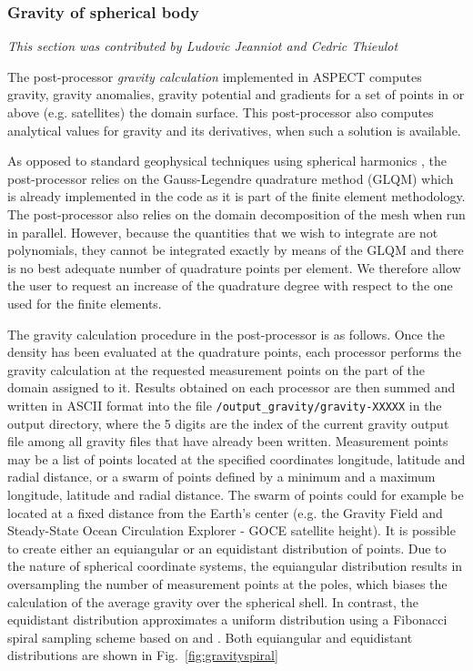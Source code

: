 \subsubsection{Gravity of spherical body}
\label{sec:benchmark_gravity_prem}

\textit{This section was contributed by Ludovic Jeanniot and Cedric Thieulot}

The post-processor \textit{gravity calculation} implemented in ASPECT computes gravity, gravity anomalies, gravity potential and gradients for a set of points in or above (e.g. satellites) the domain surface. This post-processor also computes  analytical values for gravity and its derivatives, when such a solution is available.

As opposed to standard geophysical techniques using spherical harmonics
\cite{sjoberg2017gravity}, the post-processor relies on the Gauss-Legendre quadrature method (GLQM) which is already implemented in the code 
as it is part of the finite element methodology. The post-processor also relies on the domain decomposition of the mesh when run in parallel. 
However, because the quantities that we wish to integrate are not polynomials, they cannot be integrated exactly by means of the GLQM and there is no best adequate number of quadrature points per element. We therefore allow the user to request an increase of the quadrature degree with respect to the one used for the finite elements.

The gravity calculation procedure in the post-processor is as follows. Once the density has been evaluated at the quadrature points, each processor performs the gravity calculation at the requested measurement points on the part of the domain assigned to it.
Results obtained on each processor are then summed and written in ASCII format into the file \texttt{/output\_gravity/gravity-XXXXX} in the output directory, where the 5 digits are the index of the current gravity output file among all gravity files that have already been written.
Measurement points may be a list of points located at the specified coordinates longitude, latitude and radial distance, or a swarm of points defined by a minimum and a maximum longitude, latitude and radial distance. The swarm of points could for example be located at a fixed distance from the Earth's center (e.g. the Gravity Field and Steady-State Ocean Circulation Explorer - GOCE satellite height). It is possible to create either an equiangular or an equidistant distribution of points. Due to the nature of spherical coordinate systems, the equiangular distribution results in oversampling the number of measurement points at the poles, which biases the calculation of the average gravity over the spherical shell. In contrast, the equidistant distribution approximates a uniform distribution using a Fibonacci spiral sampling scheme based on \cite{gonzalez2010measurement} and \cite{carlson2011made}. Both equiangular and equidistant distributions are shown in Fig.~\ref{fig:gravityspiral} 

